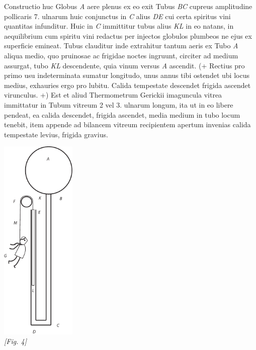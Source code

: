 \pstart [96 r\textsuperscript{o}] Constructio huc 
   \pend          
    \pstart         Globus \textit{A} aere plenus  ex eo exit Tubus \textit{BC} cupreus amplitudine pollicaris  7. ulnarum huic conjunctus in \textit{C} alius \textit{DE} cui certa spiritus vini\protect{} quantitas infunditur. Huic in \textit{C} immittitur tubus alius \textit{KL} in eo natans, in aequilibrium\protect{} cum spiritu vini\protect{} redactus per injectos globulos  plumbeos ne ejus ex superficie  emineat. Tubus clauditur  inde extrahitur tantum aeris ex  Tubo \textit{A}  aliqua medio, quo  pruinosae ac frigidae noctes ingruunt,  circiter ad medium assurgat, tubo \textit{KL} descendente, quia vinum versus \textit{A}  ascendit. (+ Rectius pro primo usu indeterminata sumatur longitudo, unus annus  tibi ostendet ubi locus medius, exhauries  ergo pro lubitu. Calida tempestate descendet frigida ascendet virunculus. +) Est  et aliud Thermometrum\protect{} Gerickii\protect{} imaguncula vitrea immittatur in Tubum vitreum  2 vel 3. ulnarum longum, ita ut in eo libere  pendeat, ea calida descendet, frigida ascendet,  media medium in tubo locum tenebit, item appende  ad bilancem vitreum recipientem apertum invenias calida tempestate levius, frigida gravius.
    \pend 
                     \begin{center}                   
                \includegraphics[width=0.27\textwidth]{images/LH35_14_2_96r1}\\\textit{[Fig. 4]} 
                        \end{center}
